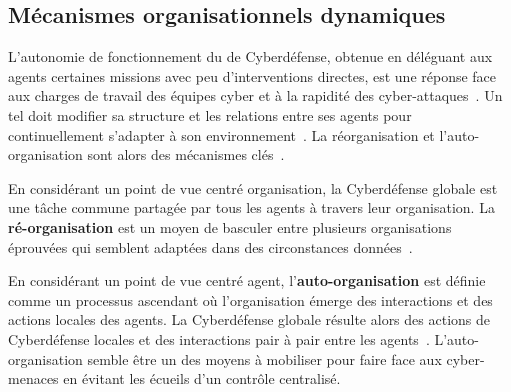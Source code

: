 \subsection{Mécanismes organisationnels dynamiques}

L'autonomie de fonctionnement du  de Cyberdéfense, obtenue en déléguant aux agents certaines missions avec peu d'interventions directes, est une réponse face aux charges de travail des équipes cyber et à la rapidité des cyber-attaques~\cite{ieeesp_KottT20}.
Un tel  doit modifier sa structure et les relations entre ses agents pour continuellement s'adapter à son environnement~\cite{theron_autonomous_2021}.
La réorganisation et l'auto-organisation sont alors des mécanismes clés~\cite{picard2009reorganisation}.

En considérant un point de vue centré organisation, la Cyberdéfense globale est une tâche commune partagée par tous les agents à travers leur organisation.
La \textbf{ré-organisation} est un moyen de basculer entre plusieurs organisations éprouvées qui semblent adaptées dans des circonstances données~\cite{picard2009reorganisation}.

En considérant un point de vue centré agent, l'\textbf{auto-organisation} est définie comme un processus ascendant où l'organisation émerge des interactions et des actions locales des agents.
La Cyberdéfense globale résulte alors des actions de Cyberdéfense locales et des interactions pair à pair entre les agents~\cite{picard2009reorganisation}.
L'auto-organisation semble être un des moyens à mobiliser pour faire face aux cyber-menaces en évitant les écueils d'un contrôle centralisé.



